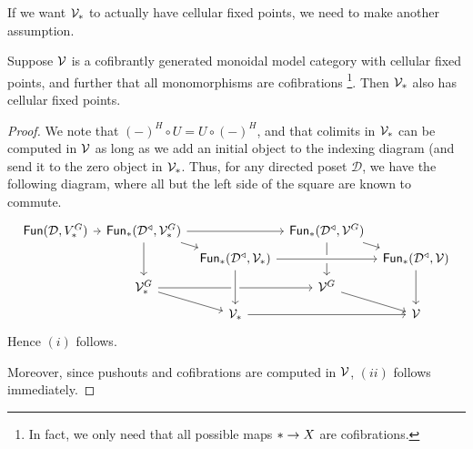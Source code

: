 \documentclass[a4paper,10pt
,draft
]{article}%
\renewcommand{\1}{\eta}%
\begin{document}
{\color{OliveGreen} %
  If we want $\V_{\**}$ to actually have cellular fixed points, we need to make another assumption.
  \begin{lemma}
        \label{PT_CELL_LEM}
        Suppose $\mathcal V$ is a  cofibrantly generated monoidal model category with cellular fixed points,
        and further that all monomorphisms are cofibrations
        \footnote{
          In fact, we only need that all possible maps $\** \to X$ are cofibrations.
        }.
        Then $\V_{\**}$ also has cellular fixed points.
  \end{lemma}
  \begin{proof}
        We note that $(-)^H \circ U = U \circ (-)^H$,
        and that colimits in $\V_{\**}$ can be computed in $\mathcal V$ as long as we add an initial object to the indexing diagram (and send it to the zero object in $\V_{\**}$.
        Thus, for any directed poset $\mathcal D$, we have the following diagram, where all but the left side of the square are known to commute.
        \begin{equation}
              \begin{tikzcd}[row sep = tiny, column sep = tiny]
                    \Fun(\mathcal D, V^G_{\**}) \arrow[r]
                    &
                    \Fun_{\**}(\mathcal D^\triangleleft, \V^G_{\**}) \arrow[rr] \arrow[dd] \arrow[dr]
                    &&
                    \Fun_{\**}(\mathcal D^\triangleleft, \V^G) \arrow[dd] \arrow[dr]
                    \\
                    &&
                    \Fun_{\**}(\mathcal D^\triangleleft, \V_{\**}) \arrow[rr, crossing over]
                    &&
                    \Fun_{\**}(\mathcal D^\triangleleft, \V) \arrow[dd]
                    \\
                    &
                    \V^G_{\**} \arrow[rr] \arrow[dr]
                    &&
                    \V^G \arrow[dr]
                    \\
                    &&
                    \V_{\**} \arrow[rr] \arrow[uu, leftarrow, crossing over]
                    &&
                    \V
              \end{tikzcd}
        \end{equation}
        Hence $(i)$ follows.
        
        Moreover, since pushouts and cofibrations are computed in $\mathcal V$, $(ii)$ follows immediately.


\end{proof}}
\end{document}
